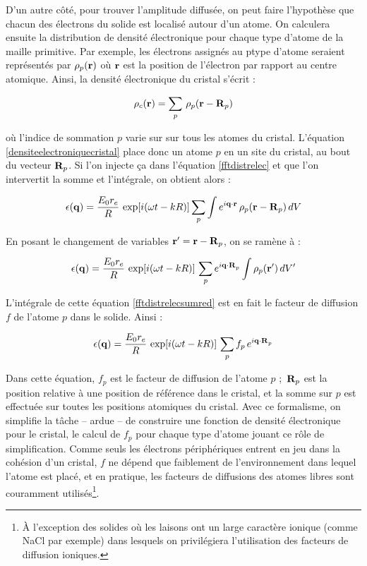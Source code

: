 D'un autre côté, pour trouver l'amplitude diffusée, on peut faire l'hypothèse que chacun des électrons du solide est localisé autour d'un atome. On calculera ensuite la distribution de densité électronique pour chaque type d'atome de la maille primitive. Par exemple, les
électrons assignés au p\ieme type d'atome seraient représentés par $\rho_p(\mathbf{r})$ où $\mathbf{r}$ est la position de l'électron par rapport au centre atomique. Ainsi, la densité électronique du cristal s'écrit :

\begin{equation}
    \rho_c(\mathbf{r}) = \sum_p \, \rho_p(\mathbf{r - R}_p)
    \label{densiteelectroniquecristal}
\end{equation}

où l'indice de sommation $p$ varie sur sur tous les atomes du cristal. L'équation
\ref{densiteelectroniquecristal} place donc un atome $p$ en un site du cristal, au
bout du vecteur $\mathbf{R}_p$. Si l'on injecte ça dans l'équation \ref{fftdistrelec}
et que l'on intervertit la somme et l'intégrale, on obtient alors :

\begin{equation}
   \epsilon(\mathbf{q}) = \frac{E_0 r_e}{R}\, \exp [i(\omega t - k R)]
   \sum_p \int e^{i \mathbf{q \cdot r}}\, \rho_p (\mathbf{r - R}_p)\, dV
    \label{fftdistrelecsum}
\end{equation}

En posant le changement de variables $\mathbf{r' = r - R}_p$, on se ramène
à :

\begin{equation}
    \epsilon(\mathbf{q}) = \frac{E_0 r_e}{R}\, \exp [i(\omega t - k R)]\,
    \sum_p e^{i\mathbf{q \cdot R}_p} \int  \rho_p (\mathbf{r'})\, dV'
    \label{fftdistrelecsumred}
\end{equation}

L'intégrale de cette équation \ref{fftdistrelecsumred} est en fait le facteur de diffusion $f$ de l'atome $p$ dans le solide. Ainsi :


\begin{equation}
   \epsilon(\mathbf{q}) = \frac{E_0 r_e}{R}\, \exp [i(\omega t - k R)]\, \sum_p  f_p\, e^{i \mathbf{q \cdot R}_p}
    \label{fftdistrelecsumf}
\end{equation}

Dans cette équation, $f_p$ est le facteur de diffusion de l'atome $p$ ; $\mathbf{R}_p$ est la position relative à une position de référence dans le
cristal, et la somme sur $p$ est effectuée sur toutes les positions atomiques du
cristal. Avec ce formalisme, on simplifie la tâche -- ardue -- de construire une
fonction de densité électronique pour le cristal, le calcul de $f_p$ pour chaque type d'atome jouant ce rôle de simplification.
Comme seuls les électrons périphériques entrent en jeu dans la cohésion d'un
cristal, $f$ ne dépend que faiblement de l'environnement dans lequel l'atome est
placé, et en pratique, les facteurs de diffusions des atomes libres sont
couramment utilisés\footnote{À l'exception des solides où les laisons ont un
    large caractère ionique (comme NaCl par exemple) dans lesquels on privilégiera l'utilisation des facteurs de diffusion ioniques.}.

